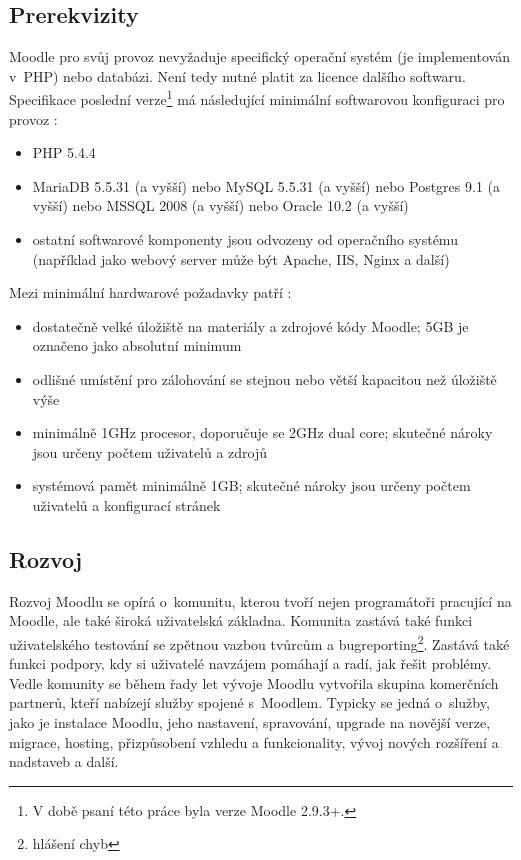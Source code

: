 \documentclass[
print,
  11pt,
  table,   
  nolof,    
  nolot,
  oneside,final
]{fithesis3}
\begin{document}
		\subsection{Prerekvizity}
Moodle pro svůj provoz nevyžaduje specifický operační systém (je implementován v~PHP) nebo databázi. Není tedy nutné platit za licence dalšího softwaru. Specifikace poslední verze\footnote{V době psaní této práce byla verze Moodle 2.9.3+.}  má následující minimální softwarovou konfiguraci pro provoz \cite{softprereq}:
\begin{itemize}
\item PHP 5.4.4
\item MariaDB 5.5.31 (a vyšší) nebo MySQL 5.5.31 (a vyšší) nebo Postgres 9.1 (a vyšší) nebo MSSQL 2008 (a vyšší) nebo Oracle 10.2 (a vyšší)
\item ostatní softwarové komponenty jsou odvozeny od operačního systému (například jako webový server může být Apache, IIS, Nginx a další) 
\end{itemize}

Mezi minimální hardwarové požadavky patří \cite{hardprereq}:

\begin{itemize}
\item dostatečně velké úložiště na materiály a zdrojové kódy Moodle; 5GB je označeno jako absolutní minimum 
\item odlišné umístění pro zálohování se stejnou nebo větší kapacitou než úložiště výše
\item minimálně 1GHz procesor, doporučuje se 2GHz dual core; skutečné nároky jsou určeny počtem uživatelů a zdrojů
\item systémová pamět minimálně 1GB; skutečné nároky jsou určeny počtem uživatelů a konfigurací stránek
\end{itemize}


		\subsection{Rozvoj}
Rozvoj Moodlu se opírá o~komunitu, kterou tvoří nejen programátoři pracující na Moodle, ale také široká uživatelská základna. Komunita zastává také funkci uživatelského testování se zpětnou vazbou tvůrcům a bugreporting\footnote{hlášení chyb}. Zastává také funkci podpory, kdy si uživatelé navzájem pomáhají a radí, jak řešit problémy. Vedle komunity se během řady let vývoje Moodlu vytvořila skupina komerčních partnerů, kteří nabízejí služby spojené s~Moodlem. Typicky se jedná o~služby, jako je instalace Moodlu, jeho nastavení, spravování, upgrade na novější verze, migrace, hosting, přizpůsobení vzhledu a funkcionality, vývoj nových rozšíření a nadstaveb a další.
\end{document}
